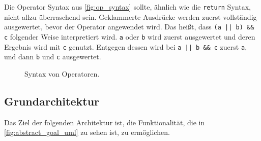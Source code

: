       Die Operator Syntax aus \autoref{fig:op_syntax} sollte, ähnlich wie die \lstinline[style=MyMacroStyleIn]$return$ Syntax,
      nicht allzu überraschend sein. %
      Geklammerte Ausdrücke werden zuerst vollständig ausgewertet, bevor der Operator angewendet wird. Das heißt, dass \lstinline[style=MyMacroStyleIn]$(a || b) && c$ folgender Weise interpretiert wird.
      \lstinline[style=MyMacroStyleIn]$a$ oder \lstinline[style=MyMacroStyleIn]$b$ wird zuerst ausgewertet und deren Ergebnis wird mit \lstinline[style=MyMacroStyleIn]$c$ genutzt. Entgegen dessen wird bei \lstinline[style=MyMacroStyleIn]$a || b && c$ zuerst \lstinline[style=MyMacroStyleIn]$a$, und dann \lstinline[style=MyMacroStyleIn]$b$ und \lstinline[style=MyMacroStyleIn]$c$ ausgewertet.
      \begin{figure}[H]
        \centering
        \caption{Syntax von Operatoren.}
        \label{fig:op_syntax}
      \end{figure}

  \subsection{Grundarchitektur}
  \label{ssec:Grundarchitektur}
    Das Ziel der folgenden Architektur ist,
    die Funktionalität, die in \autoref{fig:abstract_goal_uml} zu sehen ist, %
    zu ermöglichen.

